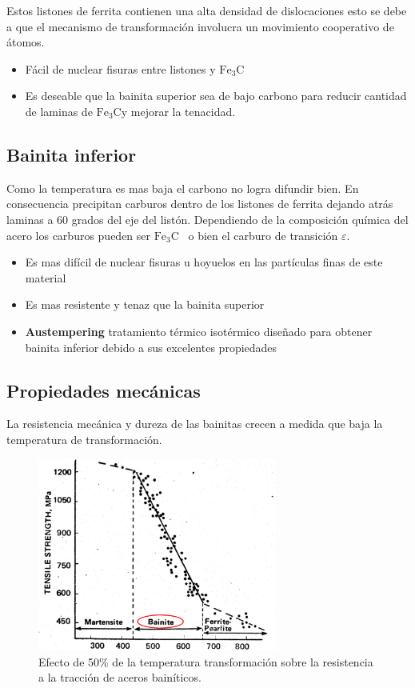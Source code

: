 \documentclass{article}
\newcommand{\cementita}{\ensuremath{\mathrm{Fe}_3 \mathrm{C}}}
\begin{document}
Estos listones de ferrita contienen una alta densidad de dislocaciones esto se debe a que el mecanismo de transformación involucra un movimiento cooperativo de átomos.
\begin{itemize}
    \item Fácil de nuclear fisuras entre listones y \cementita
    \item Es deseable que la bainita superior sea de bajo carbono para reducir cantidad de laminas de \cementita y mejorar la tenacidad.
\end{itemize}



\subsection{Bainita inferior}
Como la temperatura es mas baja el carbono no logra difundir bien. En consecuencia precipitan carburos dentro de los listones de ferrita dejando atrás laminas a 60 grados del eje del listón. Dependiendo de la composición química del acero los carburos pueden ser \cementita~ o bien el carburo de transición $\varepsilon$.
\begin{itemize}
    \item Es mas difícil de nuclear fisuras u hoyuelos en las partículas finas de este material
    \item Es mas resistente y tenaz que la bainita superior
    \item \textbf{Austempering} tratamiento térmico isotérmico diseñado para obtener bainita inferior debido a sus excelentes propiedades 
\end{itemize}


\subsection{Propiedades mecánicas}
La resistencia mecánica y dureza de las bainitas crecen a medida que baja la temperatura de transformación.

\begin{figure}[htb!]
    \centering
    \includegraphics[width=0.7\textwidth]{fig/RmVsBainitaMartensita.PNG}
    \caption{Efecto de 50\% de la temperatura transformación sobre la resistencia a la tracción de aceros bainíticos.}
    \label{fig:RmVsBainitaMartensita}
\end{figure}
\end{document}
